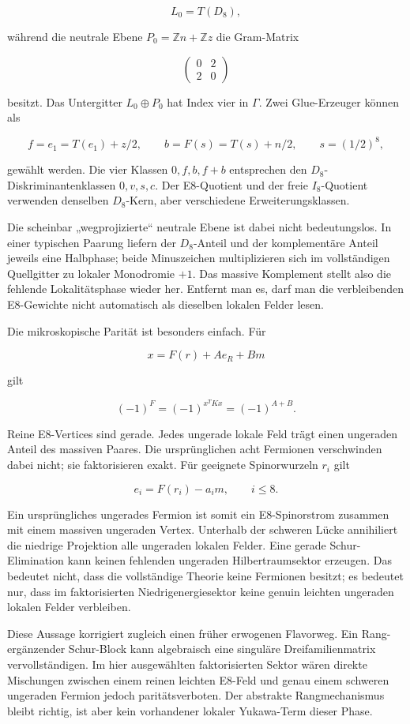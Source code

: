 \[
L_0=T(D_8),
\]

während die neutrale Ebene \(P_0=\mathbb Zn+\mathbb Zz\) die Gram-Matrix

\[
\begin{pmatrix}0&2\\2&0\end{pmatrix}
\]

besitzt. Das Untergitter \(L_0\oplus P_0\) hat Index vier in \(\Gamma\). Zwei Glue-Erzeuger können als

\[
f=e_1=T(e_1)+z/2,\qquad
b=F(s)=T(s)+n/2,\qquad s=(1/2)^8,
\]

gewählt werden. Die vier Klassen \(0,f,b,f+b\) entsprechen den \(D_8\)-Diskriminantenklassen \(0,v,s,c\). Der E8-Quotient und der freie \(I_8\)-Quotient verwenden denselben \(D_8\)-Kern, aber verschiedene Erweiterungsklassen.

Die scheinbar „wegprojizierte“ neutrale Ebene ist dabei nicht bedeutungslos. In einer typischen Paarung liefern der \(D_8\)-Anteil und der komplementäre Anteil jeweils eine Halbphase; beide Minuszeichen multiplizieren sich im vollständigen Quellgitter zu lokaler Monodromie \(+1\). Das massive Komplement stellt also die fehlende Lokalitätsphase wieder her. Entfernt man es, darf man die verbleibenden E8-Gewichte nicht automatisch als dieselben lokalen Felder lesen.

Die mikroskopische Parität ist besonders einfach. Für

\[
x=F(r)+Ae_R+Bm
\]

gilt

\[
(-1)^F=(-1)^{x^TKx}=(-1)^{A+B}.
\]

Reine E8-Vertices sind gerade. Jedes ungerade lokale Feld trägt einen ungeraden Anteil des massiven Paares. Die ursprünglichen acht Fermionen verschwinden dabei nicht; sie faktorisieren exakt. Für geeignete Spinorwurzeln \(r_i\) gilt

\[
e_i=F(r_i)-a_i m,\qquad i\leq 8.
\]

Ein ursprüngliches ungerades Fermion ist somit ein E8-Spinorstrom zusammen mit einem massiven ungeraden Vertex. Unterhalb der schweren Lücke annihiliert die niedrige Projektion alle ungeraden lokalen Felder. Eine gerade Schur-Elimination kann keinen fehlenden ungeraden Hilbertraumsektor erzeugen. Das bedeutet nicht, dass die vollständige Theorie keine Fermionen besitzt; es bedeutet nur, dass im faktorisierten Niedrigenergiesektor keine genuin leichten ungeraden lokalen Felder verbleiben.

Diese Aussage korrigiert zugleich einen früher erwogenen Flavorweg. Ein Rang-ergänzender Schur-Block kann algebraisch eine singuläre Dreifamilienmatrix vervollständigen. Im hier ausgewählten faktorisierten Sektor wären direkte Mischungen zwischen einem reinen leichten E8-Feld und genau einem schweren ungeraden Fermion jedoch paritätsverboten. Der abstrakte Rangmechanismus bleibt richtig, ist aber kein vorhandener lokaler Yukawa-Term dieser Phase.

